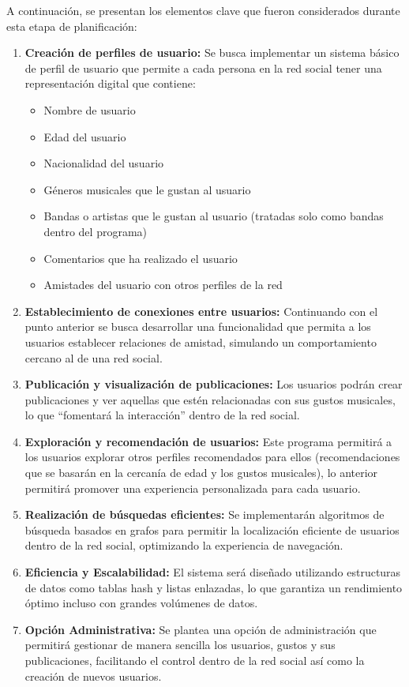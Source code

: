 A continuación, se presentan los elementos clave que fueron considerados durante esta etapa de planificación:
\begin{enumerate}
    \item \textbf{Creación de perfiles de usuario:} Se busca implementar un sistema básico de perfil de usuario que permite a cada persona en la red social tener una representación digital que contiene:
    \begin{itemize}
        \item Nombre de usuario
        \item Edad del usuario
        \item Nacionalidad del usuario
        \item Géneros musicales que le gustan al usuario
        \item Bandas o artistas que le gustan al usuario (tratadas solo como bandas dentro del programa)
        \item Comentarios que ha realizado el usuario
        \item Amistades del usuario con otros perfiles de la red
    \end{itemize}
    \item \textbf{Establecimiento de conexiones entre usuarios:} Continuando con el punto anterior se busca desarrollar una funcionalidad que permita a los usuarios establecer relaciones de amistad, simulando un comportamiento cercano al de una red social.
    \item \textbf{Publicación y visualización de publicaciones:} Los usuarios podrán crear publicaciones y ver aquellas que estén relacionadas con sus gustos musicales, lo que ``fomentará la interacción'' dentro de la red social.
    \item \textbf{Exploración y recomendación de usuarios:} Este programa permitirá a los usuarios explorar otros perfiles recomendados para ellos (recomendaciones que se basarán en la cercanía de edad y los gustos musicales), lo anterior permitirá promover una experiencia personalizada para cada usuario.
    \item \textbf{Realización de búsquedas eficientes:} Se implementarán algoritmos de búsqueda basados en grafos para permitir la localización eficiente de usuarios dentro de la red social, optimizando la experiencia de navegación.
    \item \textbf{Eficiencia y Escalabilidad:} El sistema será diseñado utilizando estructuras de datos como tablas hash y listas enlazadas, lo que garantiza un rendimiento óptimo incluso con grandes volúmenes de datos.
    \item \textbf{Opción Administrativa:} Se plantea una opción de administración que permitirá gestionar de manera sencilla los usuarios, gustos y sus publicaciones, facilitando el control dentro de la red social así como la creación de nuevos usuarios.
\end{enumerate}

